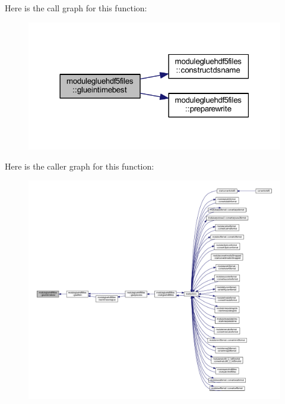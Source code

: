 Here is the call graph for this function\+:\nopagebreak
\begin{figure}[H]
\begin{center}
\leavevmode
\includegraphics[width=318pt]{namespacemodulegluehdf5files_a58aecafa3c64f2f6546b818404f30b15_cgraph}
\end{center}
\end{figure}
Here is the caller graph for this function\+:\nopagebreak
\begin{figure}[H]
\begin{center}
\leavevmode
\includegraphics[width=350pt]{namespacemodulegluehdf5files_a58aecafa3c64f2f6546b818404f30b15_icgraph}
\end{center}
\end{figure}
\mbox{\label{namespacemodulegluehdf5files_acbfe773d67d0b68688bd5a0cf161456c}} 
